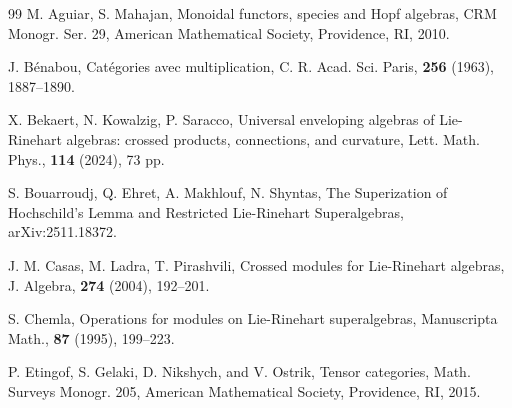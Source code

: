 \documentclass[11pt]{amsart}
\theoremstyle{definition}
\numberwithin{equation}{section}
\begin{document}
\begin{thebibliography}{99}
	 M. Aguiar, S. Mahajan, Monoidal functors, species and Hopf algebras, CRM Monogr. Ser. 29, American Mathematical Society, Providence, RI, 2010.
	
	 J. B\'enabou, Cat\'egories avec multiplication, 
	C. R. Acad. Sci. Paris,  {\bf 256} (1963), 1887--1890.
	
	 X. Bekaert, N. Kowalzig, P. Saracco, Universal enveloping algebras of Lie-Rinehart algebras: crossed products, connections, and curvature, Lett. Math. Phys.,  {\bf 114}  (2024),  73 pp.
	
	
	
	
	
	
	 S.  Bouarroudj, Q.  Ehret, A. Makhlouf, N. Shyntas, The Superization of Hochschild's Lemma and Restricted Lie-Rinehart Superalgebras, arXiv:2511.18372. 
	
	  J. M. Casas, M.  Ladra, T. Pirashvili, Crossed modules for Lie-Rinehart algebras,
	J. Algebra, {\bf 274} (2004),  192--201.
	
	 S. Chemla, Operations for modules on Lie-Rinehart superalgebras, Manuscripta Math., {\bf 87} (1995), 199--223.
	
	 P. Etingof, S. Gelaki, D. Nikshych, and V. Ostrik, Tensor categories, Math. Surveys Monogr. 205, American Mathematical Society, Providence, RI, 2015.
	

\end{thebibliography}
\end{document}
